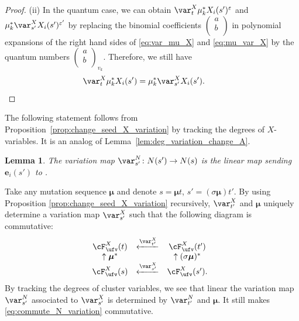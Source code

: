 \documentclass[pdftex]{sigma}
\newcommand{\seq}{\boldsymbol{\mu}}%
\newcommand{\ee}{\mathbf{e}}
\numberwithin{equation}{section}
\newtheorem{Lemma}[Theorem]{Lemma}
\begin{document}
\begin{proof}
(ii) In the quantum case, we can obtain $\var_{t}^{X}\mu_{k}^{*}X_{i}(s')^\varepsilon$ and $\mu_{k}^{*}\var_{s'}^{X}X_{i}(s')^{\varepsilon'}$ by replacing the binomial coefficients $\left(\begin{smallmatrix}
 a\\
 b\\
 \end{smallmatrix}\right)$ in polynomial expansions of the right hand sides of \eqref{eq:var_mu_X} and \eqref{eq:mu_var_X} by the quantum numbers $\left(\begin{smallmatrix}
 a\\
 b\\
 \end{smallmatrix}\right)_{v_k}$. Therefore, we still have \[\var_{t}^{X}\mu_{k}^{*}X_{i}(s')=\mu_{k}^{*}\var_{s'}^{X}X_{i}(s').\tag*{\qed} \]\renewcommand{\qed}{}
\end{proof}

The following statement follows from Proposition~\ref{prop:change_seed_X_variation}
by tracking the degrees of $X$-variables. It is an analog of Lemma~\ref{lem:deg_variation_change_A}.

\begin{Lemma}
The variation map $\var_{s'}^{N}\colon N(s')\rightarrow N(s)$ is the linear
map sending $\ee_{i}(s')$ to .
\end{Lemma}

Take any mutation sequence $\seq$ and denote $s=\seq t$, $s'=(\sigma\seq)t'$.
By using Proposition \ref{prop:change_seed_X_variation} recursively, $\var_{t'}^{X}$
and $\seq$ uniquely determine a variation map $\var_{s'}^{X}$ such
that the following diagram is commutative:
\begin{align}
\begin{array}{@{}ccc}
 \cF^X_{\ufv}(t) & \xleftarrow{\var_{t'}^{X}} & \cF^X_{\ufv}(t')\\
\uparrow\seq^{*} & & \uparrow(\sigma\seq)^{*}\\
\cF^X_{\ufv}(s) & \xleftarrow{\var_{s'}^{X}} & \cF^X_{\ufv}(s').
\end{array}\label{eq:commute_X_variation_seq}
\end{align}
By tracking the degrees of cluster variables, we see that linear the variation
map $\var_{s'}^{N}$ associated to $\var_{s'}^{X}$ is determined
by $\var_{t'}^{N}$ and $\seq$. It still makes \eqref{eq:commute_N_variation}
commutative.
\end{document}
